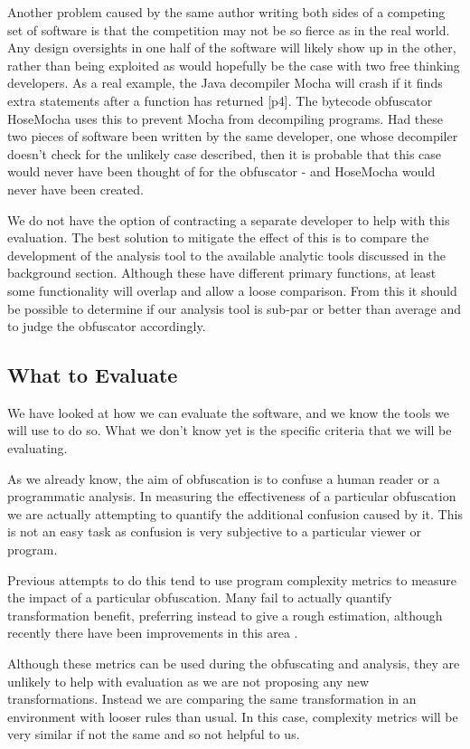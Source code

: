 \documentclass{report}
\begin{document}
Another problem caused by the same author writing both sides of a competing set of software is that the competition
may not be so fierce as in the real world. Any design oversights in one half of the software will likely show up
in the other, rather than being exploited as would hopefully be the case with two free thinking developers. As a real
example, the Java decompiler Mocha will crash if it finds extra statements after a function has returned
\cite{hosemocha}[p4]. The bytecode obfuscator HoseMocha uses this to prevent Mocha from decompiling programs. Had these two
pieces of software been written by the same developer, one whose decompiler doesn't check for the unlikely case described,
then it is probable that this case would never have been thought of for the obfuscator - and HoseMocha would never have
been created.

We do not have the option of contracting a separate developer to help with this evaluation. The best solution to mitigate the effect
of this is to compare the development of the analysis tool to the available analytic tools discussed in the background section. Although
these have different primary functions, at least some functionality will overlap and allow a loose comparison. From this it
should be possible to determine if our analysis tool is sub-par or better than average and to judge the obfuscator
accordingly.

\subsection{What to Evaluate}

We have looked at how we can evaluate the software, and we know the tools we will use to do so. What we don't know yet is
the specific criteria that we will be evaluating. 

As we already know, the aim of obfuscation is to confuse a human reader or a programmatic analysis. In measuring the effectiveness
of a particular obfuscation we are actually attempting to quantify the additional confusion caused by it. This is not an easy task
as confusion is very subjective to a particular viewer or program.

Previous attempts to do this tend to use program complexity metrics to measure the impact of a particular obfuscation. Many fail to
actually quantify transformation benefit, preferring instead to give a rough estimation, although recently there have been improvements in
this area \cite{obfquant}.

Although these metrics can be used during the obfuscating and analysis, they are unlikely to help with evaluation as we are
not proposing any new transformations. Instead we are comparing the same transformation in an environment with looser rules than usual.
In this case, complexity metrics will be very similar if not the same and so not helpful to us.
\end{document}
